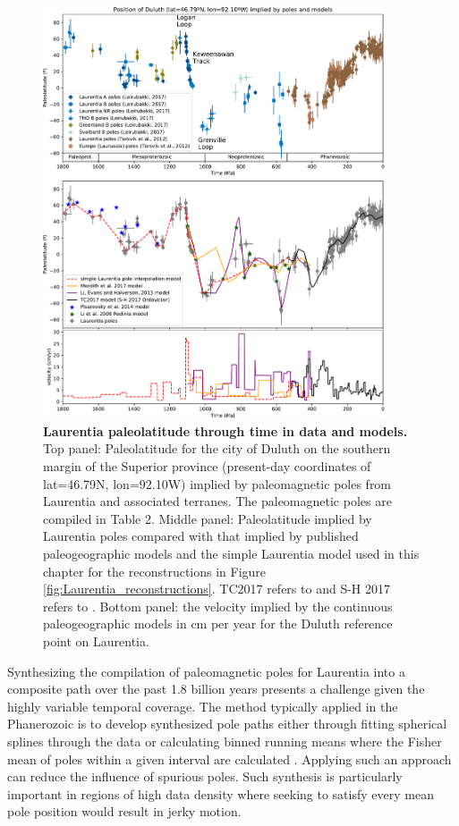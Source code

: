 \documentclass[twocolumn, switch]{article} %
\begin{document}
\begin{figure}
\centering
\includegraphics[width=0.9\textwidth]{../Figures/Laurentia_paleolatitude.pdf}
\caption{\textbf{Laurentia paleolatitude through time in data and models.} Top panel: Paleolatitude for the city of Duluth on the southern margin of the Superior province (present-day coordinates of lat=46.79\textdegree N, lon=92.10\textdegree W) implied by paleomagnetic poles from Laurentia and associated terranes. The paleomagnetic poles are compiled in Table 2. Middle panel: Paleolatitude implied by Laurentia poles compared with that implied by published paleogeographic models and the simple Laurentia model used in this chapter for the reconstructions in Figure \ref{fig:Laurentia_reconstructions}. TC2017 refers to \cite{Torsvik2017a} and S-H 2017 refers to \cite{Swanson-Hysell2017a}. Bottom panel: the velocity implied by the continuous paleogeographic models in cm per year for the Duluth reference point on Laurentia.}
\label{fig:Laurentia_paleolatitude}
\end{figure}

Synthesizing the compilation of paleomagnetic poles for Laurentia into a composite path over the past 1.8 billion years presents a challenge given the highly variable temporal coverage. The method typically applied in the Phanerozoic is to develop synthesized pole paths either through fitting spherical splines through the data or calculating binned running means where the Fisher mean of poles within a given interval are calculated \citep{Torsvik2012a}. Applying such an approach can reduce the influence of spurious poles. Such synthesis is particularly important in regions of high data density where seeking to satisfy every mean pole position would result in jerky motion.
\end{document}
